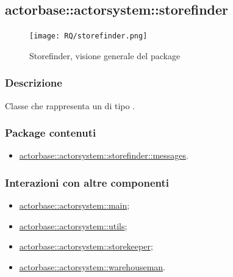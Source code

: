 \documentclass{scalatekids-article}
\begin{document}

\subsection{actorbase::actorsystem::storefinder} %
\label{sec:actorbase::actorsystem::storefinder}

\begin{figure}[H]
  \begin{center}
    \texttt{[image: RQ/storefinder.png]}
    \caption{Storefinder, visione generale del package}
  \end{center}
\end{figure}

\subsubsection{Descrizione}
Classe che rappresenta un  di tipo .

\subsubsection{Package contenuti}
\begin{itemize}
\item \hyperref[sec:actorbase::actorsystem::storefinder::messages]{actorbase::actorsystem::storefinder::messages}.
\end{itemize}

\subsubsection{Interazioni con altre componenti}
\begin{itemize}
\item \hyperref[sec:actorbase::actorsystem::main]{actorbase::actorsystem::main};
\item \hyperref[sec:actorbase::actorsystem::utils]{actorbase::actorsystem::utils};
\item \hyperref[sec:actorbase::actorsystem::storekeeper]{actorbase::actorsystem::storekeeper};
\item \hyperref[sec:actorbase::actorsystem::warehouseman]{actorbase::actorsystem::warehouseman}.
\end{itemize}
\end{document}

